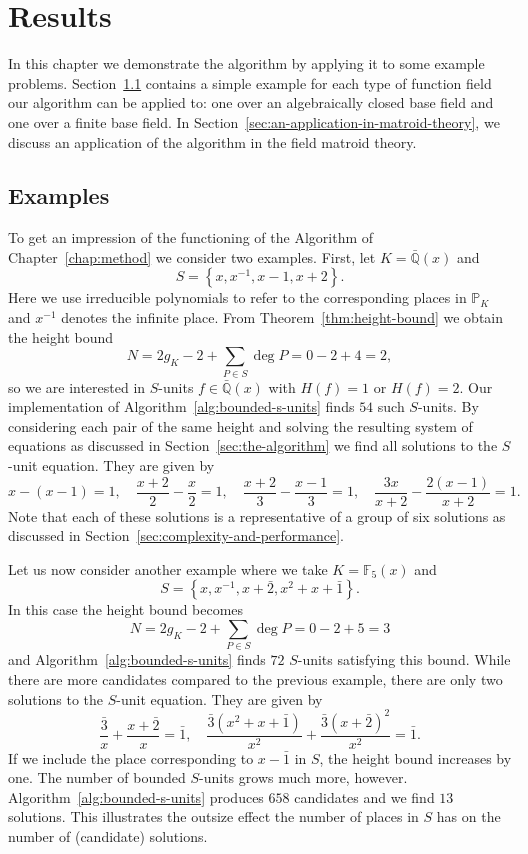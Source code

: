 
\chapter{Results}%
\label{chap:results}

In this chapter we demonstrate the algorithm by applying it to some example problems. Section~\ref{sec:examples} contains a simple example for each type of function field our algorithm can be applied to: one over an algebraically closed base field and one over a finite base field. In Section~\ref{sec:an-application-in-matroid-theory}, we discuss an application of the algorithm in the field matroid theory.

\section{Examples}%
\label{sec:examples}

To get an impression of the functioning of the Algorithm of Chapter~\ref{chap:method} we consider two examples. First, let \(K = \bar{\mathbb{Q}}(x)\) and
\[S = \left\{ x, x^{-1}, x - 1, x + 2 \right\}.\]
Here we use irreducible polynomials to refer to the corresponding places in \(\mathbb{P}_{K}\) and \(x^{-1}\) denotes the infinite place. From Theorem~\ref{thm:height-bound} we obtain the height bound
\[N = 2g_{K} - 2 + \sum_{P \in S} \deg{P} = 0 - 2 + 4 = 2,\]
so we are interested in \(S\)-units \(f \in \bar{\mathbb{Q}}(x)\) with \(H(f) = 1\) or \(H(f) = 2\). Our implementation of Algorithm~\ref{alg:bounded-s-units} finds \(54\) such \(S\)-units. By considering each pair of the same height and solving the resulting system of equations as discussed in Section~\ref{sec:the-algorithm} we find all solutions to the \(S\)-unit equation. They are given by
\[x - (x - 1) = 1, \quad \frac{x + 2}{2} - \frac{x}{2} = 1, \quad \frac{x + 2}{3} - \frac{x - 1}{3} = 1, \quad \frac{3x}{x + 2} - \frac{2(x - 1)}{x + 2} = 1.\]
Note that each of these solutions is a representative of a group of six solutions as discussed in Section~\ref{sec:complexity-and-performance}.

Let us now consider another example where we take \(K = \mathbb{F}_{5}(x)\) and
\[S = \left\{ x, x^{-1}, x + \bar{2}, x^{2} + x + \bar{1} \right\}.\]
In this case the height bound becomes
\[N = 2g_{K} - 2 + \sum_{P \in S} \deg{P} = 0 - 2 + 5 = 3\]
and Algorithm~\ref{alg:bounded-s-units} finds \(72\) \(S\)-units satisfying this bound. While there are more candidates compared to the previous example, there are only two solutions to the \(S\)-unit equation. They are given by
\[\frac{\bar{3}}{x}  + \frac{x + \bar{2}}{x} = \bar{1}, \quad \frac{\bar{3}(x^{2} + x + \bar{1})}{x^{2}} + \frac{\bar{3}{(x + \bar{2})}^{2}}{x^{2}} = \bar{1}.\]
If we include the place corresponding to \(x - \bar{1}\) in \(S\), the height bound increases by one. The number of bounded \(S\)-units grows much more, however. Algorithm~\ref{alg:bounded-s-units} produces \(658\) candidates and we find \(13\) solutions. This illustrates the outsize effect the number of places in \(S\) has on the number of (candidate) solutions.

